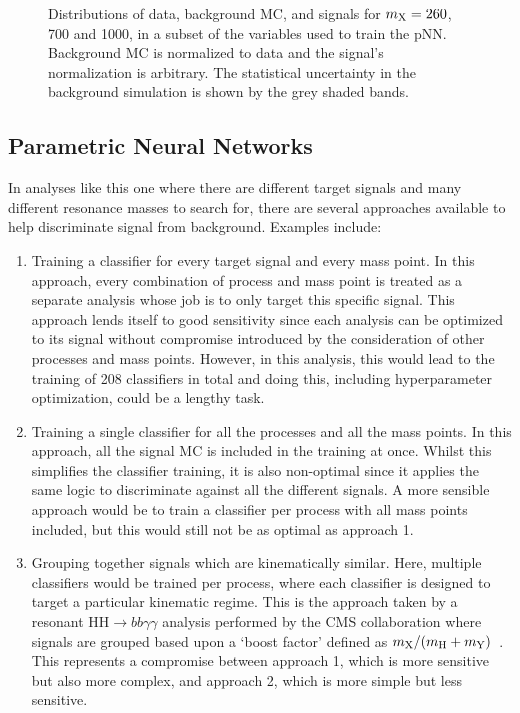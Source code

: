 \begin{figure}
    \caption[Distributions of Training Features (7)]{Distributions of data, background MC, and \XTwoHH signals for $m_{\mathrm{X}}=260$, 700 and 1000\GeV, in a subset of the variables used to train the pNN. Background MC is normalized to data and the signal's normalization is arbitrary. The statistical uncertainty in the background simulation is shown by the grey shaded bands.}\label{fig:training_features_7}
\end{figure}

\subsection{Parametric Neural Networks}\label{sec:pNN}

In analyses like this one where there are different target signals and many different resonance masses to search for, there are several approaches available to help discriminate signal from background. Examples include:
\begin{enumerate}
    \item Training a classifier for every target signal and every mass point. In this approach, every combination of process and mass point is treated as a separate analysis whose job is to only target this specific signal. This approach lends itself to good sensitivity since each analysis can be optimized to its signal without compromise introduced by the consideration of other processes and mass points. However, in this analysis, this would lead to the training of 208 classifiers in total and doing this, including hyperparameter optimization, could be a lengthy task. 
    \item Training a single classifier for all the processes and all the mass points. In this approach, all the signal MC is included in the training at once. Whilst this simplifies the classifier training, it is also non-optimal since it applies the same logic to discriminate against all the different signals. A more sensible approach would be to train a classifier per process with all mass points included, but this would still not be as optimal as approach 1.    
    \item Grouping together signals which are kinematically similar. Here, multiple classifiers would be trained per process, where each classifier is designed to target a particular kinematic regime. This is the approach taken by a resonant $\mathrm{HH}\rightarrow bb\gamma\gamma$ analysis performed by the CMS collaboration where signals are grouped based upon a `boost factor' defined as $m_{\mathrm{X}}/(m_{\mathrm{H}}+m_{\mathrm{Y}})$~\cite{CMS:2023boe}. This represents a compromise between approach 1, which is more sensitive but also more complex, and approach 2, which is more simple but less sensitive.
\end{enumerate}

